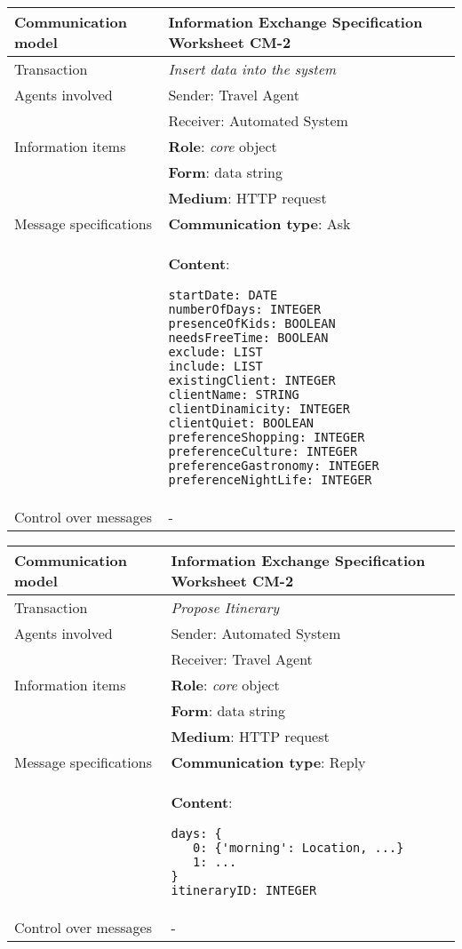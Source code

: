 \begin{tabular}%
      {|p{4cm}%
        |p{8cm}|}
\hline
{\bf Communication model} &
   {\bf Information Exchange Specification Worksheet CM-2} \\
\hline
\hline
\sc Transaction &
   {\em
   Insert data into the system
   } \\
\hline
\sc Agents involved &
   {\rm Sender: Travel Agent} \\
   & {\rm Receiver: Automated System}\\
\hline
\sc Information items 
&  {\bf Role}: {\em core} object
   \\
&  {\bf Form}: data string
   \\
&  {\bf Medium}: HTTP request
   \\
\hline
\sc Message specifications 
&  {\bf Communication type}: Ask
   \\
&  {\bf Content}: 
\begin{lstlisting}[breaklines=true,mathescape=true]
startDate: DATE 
numberOfDays: INTEGER
presenceOfKids: BOOLEAN
needsFreeTime: BOOLEAN
exclude: LIST
include: LIST
existingClient: INTEGER
clientName: STRING 
clientDinamicity: INTEGER
clientQuiet: BOOLEAN
preferenceShopping: INTEGER
preferenceCulture: INTEGER
preferenceGastronomy: INTEGER
preferenceNightLife: INTEGER
\end{lstlisting}
   \\
\hline
\sc Control over messages &
   - %
   \\
\hline
\end{tabular}
\newline
\vspace{0.8 cm}
\newline
\noindent
\begin{tabular}%
      {|p{4cm}%
        |p{8cm}|}
\hline
{\bf Communication model} &
   {\bf Information Exchange Specification Worksheet CM-2} \\
\hline
\hline
\sc Transaction &
   {\em
   Propose Itinerary
   } \\
\hline
\sc Agents involved &
   {\rm Sender: Automated System} \\
   & {\rm Receiver: Travel Agent}\\
\hline
\sc Information items 
&  {\bf Role}: {\em core} object
   \\
&  {\bf Form}: data string
   \\
&  {\bf Medium}: HTTP request
   \\
\hline
\sc Message specifications 
&  {\bf Communication type}: Reply
   \\
&  {\bf Content}: 
\begin{lstlisting}[breaklines=true,mathescape=true]
days: {
   0: {'morning': Location, ...}
   1: ...
}
itineraryID: INTEGER
\end{lstlisting}
   \\
\hline
\sc Control over messages &
   - %
   \\
\hline
\end{tabular}

